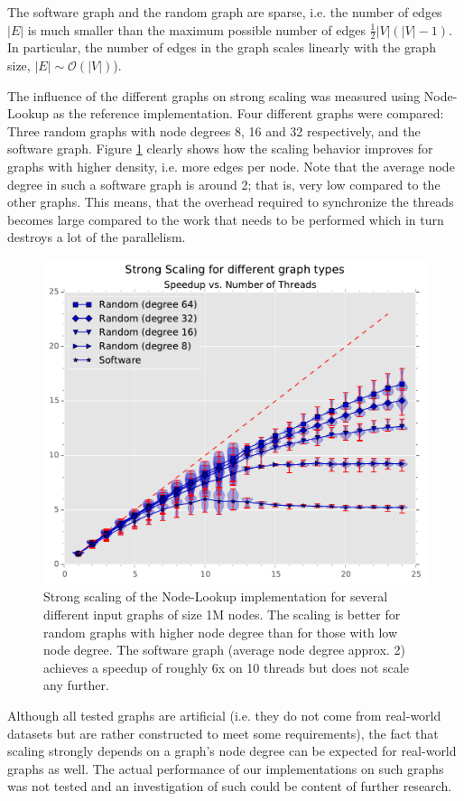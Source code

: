 The software graph and the random graph are sparse, i.e. the number of edges $|E|$ is much smaller than the maximum possible number of edges $\tfrac{1}{2}|V|(|V|-1)$.
In particular, the number of edges in the graph scales linearly with the graph size, $|E| \sim \mathcal{O} ( |V| )$).

The influence of the different graphs on strong scaling was measured using Node-Lookup as the reference implementation.
Four different graphs were compared: Three random graphs with node degrees 8, 16 and 32 respectively, and the software graph.
Figure \ref{fig:strongscaling_graphtypes} clearly shows how the scaling behavior improves for graphs with higher density, i.e. more edges per node.
Note that the average node degree in such a software graph is around 2; that is, very low compared to the other graphs.
This means, that the overhead required to synchronize the threads becomes large compared to the work that needs to be performed which in turn destroys a lot of the parallelism.

%
\begin{figure}[ht]
        \centering
        \includegraphics[width=\columnwidth]{plots/strongscaling_gtALL_n1000000.pdf}
        \caption{Strong scaling of the Node-Lookup implementation for several different input graphs of size 1M nodes. The scaling is better for random graphs with higher node degree than for those with low node degree.
                The software graph (average node degree approx. 2) achieves a speedup of roughly 6x on 10 threads but does not scale any further.
}
        \label{fig:strongscaling_graphtypes}
\end{figure}
%

Although all tested graphs are artificial (i.e. they do not come from real-world datasets but are rather constructed to meet some requirements),
the fact that scaling strongly depends on a graph's node degree can be expected for real-world graphs as well.
The actual performance of our implementations on such graphs was not tested and an investigation of such could be content of further research.